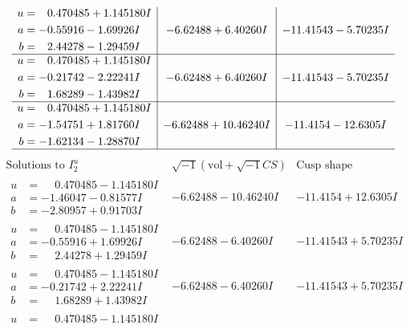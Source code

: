 \documentclass[1p]{elsarticle_modified}
\theoremstyle{definition}
\newcommand{\I}{\sqrt{-1}}
\begin{document}
$$\begin{array}{c|c|c}
\begin{aligned}
u &= \phantom{-}0.470485 + 1.145180 I \\
a &= -0.55916 - 1.69926 I \\
b &= \phantom{-}2.44278 - 1.29459 I\end{aligned}
 & -6.62488 + 6.40260 I & -11.41543 - 5.70235 I \\ \hline\begin{aligned}
u &= \phantom{-}0.470485 + 1.145180 I \\
a &= -0.21742 - 2.22241 I \\
b &= \phantom{-}1.68289 - 1.43982 I\end{aligned}
 & -6.62488 + 6.40260 I & -11.41543 - 5.70235 I \\ \hline\begin{aligned}
u &= \phantom{-}0.470485 + 1.145180 I \\
a &= -1.54751 + 1.81760 I \\
b &= -1.62134 - 1.28870 I\end{aligned}
 & -6.62488 + 10.46240 I & -11.4154 - 12.6305 I\\
 \hline 
 \end{array}$$\newpage$$\begin{array}{c|c|c}  
\text{Solutions to }I^u_{2}& \I (\text{vol} + \sqrt{-1}CS) & \text{Cusp shape}\\
 \hline 
\begin{aligned}
u &= \phantom{-}0.470485 - 1.145180 I \\
a &= -1.46047 - 0.81577 I \\
b &= -2.80957 + 0.91703 I\end{aligned}
 & -6.62488 - 10.46240 I & -11.4154 + 12.6305 I \\ \hline\begin{aligned}
u &= \phantom{-}0.470485 - 1.145180 I \\
a &= -0.55916 + 1.69926 I \\
b &= \phantom{-}2.44278 + 1.29459 I\end{aligned}
 & -6.62488 - 6.40260 I & -11.41543 + 5.70235 I \\ \hline\begin{aligned}
u &= \phantom{-}0.470485 - 1.145180 I \\
a &= -0.21742 + 2.22241 I \\
b &= \phantom{-}1.68289 + 1.43982 I\end{aligned}
 & -6.62488 - 6.40260 I & -11.41543 + 5.70235 I \\ \hline\begin{aligned}
u &= \phantom{-}0.470485 - 1.145180 I \\

\end{aligned}
\end{array}$$
\end{document}
